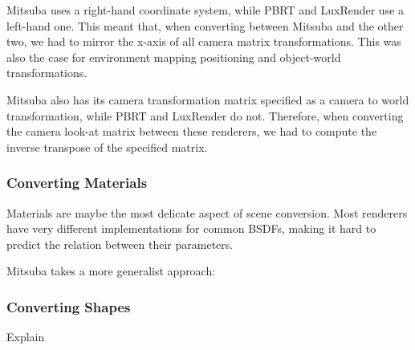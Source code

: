 Mitsuba uses a right-hand coordinate system, while PBRT and LuxRender use a 
left-hand one. This meant that, when converting between Mitsuba and the other 
two, we had to mirror the x-axis of all camera matrix transformations. This was 
also the case for environment mapping positioning and object-world 
transformations. 

Mitsuba also has its camera transformation matrix specified as a camera to world 
 transformation, while PBRT and LuxRender do not. Therefore, when converting the 
camera look-at matrix between these renderers, we had to compute the inverse 
transpose of the specified matrix.

\subsubsection{Converting Materials}
Materials are maybe the most delicate aspect of scene conversion. Most renderers 
have very different implementations for common BSDFs, making it hard to predict 
the relation between their parameters.

Mitsuba takes a more generalist approach: 

\subsubsection{Converting Shapes}
Explain
